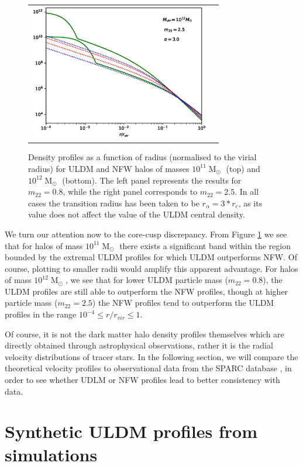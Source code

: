 \documentclass[a4paper,11pt]{article}
\begin{document}
\begin{figure}
\begin{tabular}{cc}
{\includegraphics[width = 3.1in, trim={2.1cm 0.5cm 0cm 0.5cm}]{pics/12_25_3.eps}}
\end{tabular}
\caption{Density profiles as a function of radius (normalised to the virial radius) for ULDM and NFW halos of masses $10^{11}\operatorname{M}_{\odot}$ (top) and $10^{12}\operatorname{M}_{\odot}$ (bottom). The left panel represents the results for $m_{22} = 0.8$, while the right panel corresponds to $m_{22}=2.5$. In all cases the transition radius has been taken to be $r_{\alpha} = 3*r_c$, as its value does not affect the value of the ULDM central density.}\label{fig:profiles}
\end{figure}


We turn our attention now to the core-cusp discrepancy. From Figure \ref{fig:profiles} we see that for halos of mass $10^{11}\operatorname{M}_{\odot}$ there exists a significant band within the region bounded by the extremal ULDM profiles for which ULDM outperforms NFW.  Of course, plotting to smaller radii would amplify this apparent advantage. For halos of mass $10^{12}\operatorname{M}_{\odot}$, we see that for lower ULDM particle mass ($m_{22}=0.8$), the ULDM profiles are still able to outperform the NFW profiles, though at higher particle mass ($m_{22}=2.5$) the  NFW profiles tend to outperform the ULDM profiles in the range $10^{-4}\leq r/r_{vir} \leq 1$.

Of course, it is not the dark matter halo density profiles themselves which are directly obtained through astrophysical observations, rather it is the radial velocity distributions of tracer stars. In the following section, we will compare the theoretical velocity profiles to observational data from the SPARC database \cite{Lelli:2016zqa}, in order to see whether UDLM or NFW profiles lead to better consistency with data. 

\section{Synthetic ULDM profiles from simulations}
\end{document}
